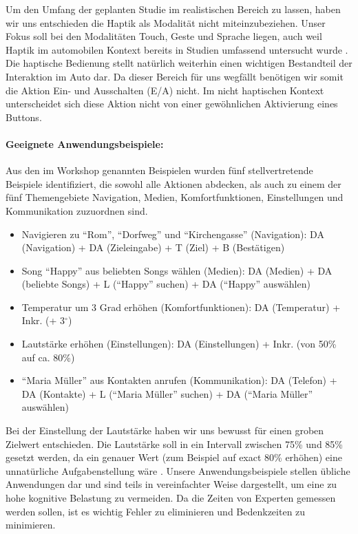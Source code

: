 Um den Umfang der geplanten Studie im realistischen Bereich zu lassen, haben wir uns entschieden die Haptik als Modalität nicht miteinzubeziehen. 
Unser Fokus soll bei den Modalitäten Touch, Geste und Sprache liegen, auch weil Haptik im automobilen Kontext bereits in Studien umfassend untersucht wurde \citep{Pettitt_2007, schneegass_2009, SchneegaB_2011}. 
Die haptische Bedienung stellt natürlich weiterhin einen wichtigen Bestandteil der Interaktion im Auto dar.
Da dieser Bereich für uns wegfällt benötigen wir somit die Aktion Ein- und Ausschalten (E/A) nicht. 
Im nicht haptischen Kontext unterscheidet sich diese Aktion nicht von einer gewöhnlichen Aktivierung eines Buttons.

\paragraph{Geeignete Anwendungsbeispiele:}
Aus den im Workshop genannten Beispielen wurden fünf stellvertretende Beispiele identifiziert, die sowohl alle Aktionen abdecken, als auch zu einem der fünf Themengebiete Navigation, Medien, Komfortfunktionen, Einstellungen und Kommunikation zuzuordnen sind. 
\begin{itemize}
\item Navigieren zu "`Rom"', "`Dorfweg"' und "`Kirchengasse"' (Navigation): DA (Navigation) + DA (Zieleingabe) + T (Ziel) + B (Bestätigen)
\item Song "`Happy"' aus beliebten Songs wählen (Medien): DA (Medien) + DA (beliebte Songs) + L ("`Happy"' suchen) + DA ("`Happy"' auswählen)
\item Temperatur um 3 Grad erhöhen (Komfortfunktionen): DA (Temperatur) + Inkr. (+ 3$^\circ$)
\item Lautstärke erhöhen (Einstellungen): DA (Einstellungen) + Inkr. (von 50\% auf ca. 80\%)
\item "`Maria Müller"' aus Kontakten anrufen (Kommunikation): DA (Telefon) + DA (Kontakte) + L ("`Maria Müller"' suchen) + DA ("`Maria Müller"' auswählen)
\end{itemize}
Bei der Einstellung der Lautstärke haben wir uns bewusst für einen groben Zielwert entschieden.
Die Lautstärke soll in ein Intervall zwischen 75\% und 85\% gesetzt werden, da ein genauer Wert (zum Beispiel auf exact 80\% erhöhen) eine unnatürliche Aufgabenstellung wäre \citep{stracke2014touch}. 
Unsere Anwendungsbeispiele stellen übliche Anwendungen dar und sind teils in vereinfachter Weise dargestellt, um eine zu hohe kognitive Belastung zu vermeiden. 
Da die Zeiten von Experten gemessen werden sollen, ist es wichtig Fehler zu eliminieren und Bedenkzeiten zu minimieren.

